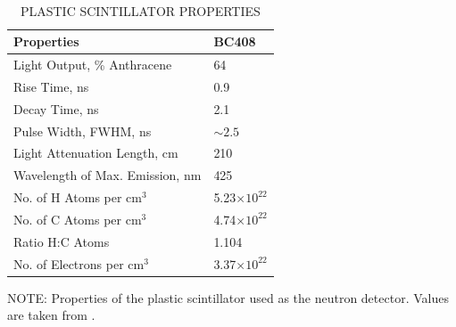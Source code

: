 \begin{table}[htp]
\centering
\caption[\uppercase{plastic scintillator properties}]{\\\uppercase{plastic scintillator properties}}
\label{tab:BC408}
\begin{tabular}{ll}\toprule
Properties & BC408 \\
\midrule
Light Output, \% Anthracene & 64 \\
Rise Time, ns & 0.9 \\
Decay Time, ns & 2.1 \\
Pulse Width, FWHM, ns & $\sim2.5$ \\
Light Attenuation Length, cm & 210 \\
Wavelength of Max. Emission, nm & 425 \\
No. of H Atoms per cm$^3$ & 5.23$\times10^{22}$ \\
No. of C Atoms per cm$^3$ & 4.74$\times10^{22}$ \\
Ratio H:C Atoms & 1.104 \\
No. of Electrons per cm$^3$ & 3.37$\times10^{22}$ \\
\bottomrule
\end{tabular}
\begin{flushleft}
\small NOTE:
Properties of the plastic scintillator used as the neutron detector. Values are taken from \citep{BC408}.
\end{flushleft}
\end{table}

